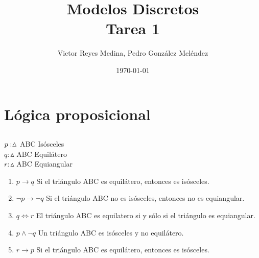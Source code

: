 \documentclass[11pt]{utalcaDoc}
\title{{\bf Modelos Discretos}\\Tarea 1}
\author{Victor Reyes Medina,  Pedro González Meléndez}
\date{\today}
\begin{document}
\renewcommand{\figurename}{Figura~}
\renewcommand{\tablename}{Tabla~}
\renewcommand{\theenumii}{\arabic{enumii}}
\renewcommand{\labelenumii}{%
  \theenumii.
}
\maketitle

\section{Lógica proposicional}

\subsection{ } %

$\\p:  \vartriangle$ ABC Isósceles \\
$q:  \vartriangle$ ABC Equilátero \\
$r:  \vartriangle$ ABC Equiangular\\

\begin{enumerate}
\item $p \to q$ Si el triángulo ABC es equilátero, entonces es isósceles.
\item $\neg p \to \neg q$ Si el triángulo ABC no es isósceles, entonces no es equiangular. 
\item $q \iff r$ El triángulo ABC es equilatero si y sólo si el triángulo es equiangular. 
\item $p \wedge \neg q$ Un triángulo ABC es isósceles y no equilátero.
\item $r \to p$ Si el triángulo ABC es equilátero, entonces es isósceles.
\end{enumerate}

\newpage 
\end{document}
